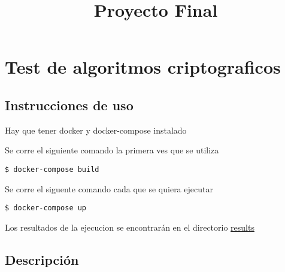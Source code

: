 \documentclass{IEEEtran}
\begin{document}
\title{Proyecto Final}
\author{
  }

\maketitle{}

\tableofcontents{}

\hypertarget{test-de-algoritmos-criptograficos}{%
  \section{Test de algoritmos
    criptograficos}\label{test-de-algoritmos-criptograficos}}

\hypertarget{instrucciones-de-uso}{%
  \subsection{Instrucciones de uso}\label{instrucciones-de-uso}}

Hay que tener docker y docker-compose instalado

Se corre el siguiente comando la primera ves que se utiliza

\begin{verbatim}
$ docker-compose build
\end{verbatim}

Se corre el siguente comando cada que se quiera ejecutar

\begin{verbatim}
$ docker-compose up
\end{verbatim}

Los resultados de la ejecucion se encontrarán en el directorio
\href{./results}{results}

\hypertarget{descripciuxf3n}{%
  \subsection{Descripción}\label{descripciuxf3n}}
\end{document}
